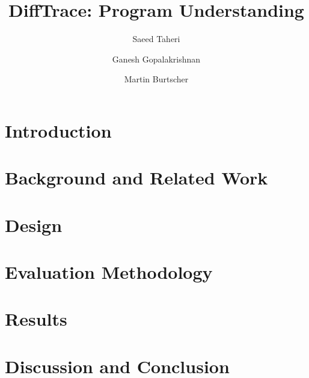 \documentclass[sigconf,review]{acmart}
\begin{document}
\title{ DiffTrace: Program Understanding}


\author{Saeed Taheri}

\author{Ganesh Gopalakrishnan}

\author{Martin Burtscher}

\maketitle


\begin{abstract}
\label{abs}

\end{abstract}




\section{Introduction}
\label{sec:intro}
%


\section{Background and Related Work}
\label{sec:bgreltool}
%

\section{Design }
\label{sec:design}
%

\section{Evaluation Methodology}
\label{sec:evalmeth}
%

\section{Results}
\label{sec:results}


    

\section{Discussion and Conclusion}
\label{sec:concl}
%



%
%
\end{document}
